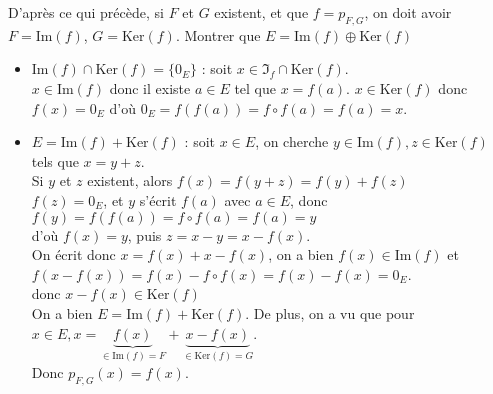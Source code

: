 \documentclass[12pt, a4paper]{report}
\begin{document}
\begin{demo}{}
D'après ce qui précède, si $F$ et $G$ existent, et que $f = p_{F,G}$, on doit avoir $F = \text{Im}(f)$, $G = \text{Ker}(f)$. 
Montrer que $E = \text{Im}(f) \oplus \text{Ker}(f)$ \\
\begin{itemize}
	\item $\text{Im}(f) \cap \text{Ker}(f) = \{0_E\}$ : soit $x \in \Im_f \cap \text{Ker}(f)$. \\
		$x \in \text{Im}(f)$ donc il existe $a \in E$ tel que $x = f(a)$.
		$x \in \text{Ker}(f)$ donc $f(x) = 0_E$ d'où $0_E = f(f(a)) = f \circ f(a) = f(a) = x$.
	
	\item $E = \text{Im}(f) + \text{Ker}(f)$ : soit $x \in E$, on cherche $y \in \text{Im}(f), z \in \text{Ker}(f)$ tels que $x = y+z$. \\
	Si $y$ et $z$ existent, alors $f(x) = f(y+z) = f(y)+f(z)$ \\
	$f(z) = 0_E$, et $y$ s'écrit $f(a)$ avec $a \in E$, donc $f(y) = f(f(a)) = f \circ f(a) = f(a) = y$ \\
	d'où $f(x) = y$, puis $z = x-y = x-f(x)$. \\
	
	On écrit donc $x = f(x) + x-f(x)$, on a bien $f(x) \in \text{Im}(f)$ et $f(x-f(x)) = f(x) - f \circ f(x) = f(x) - f(x) = 0_E$. \\
	donc $x-f(x) \in \text{Ker}(f)$\\
	
	On a bien $E = \text{Im}(f) + \text{Ker}(f)$. De plus, on a vu que pour $x \in E, x = \underbrace{f(x)}_{\in \text{Im}(f) = F} + \underbrace{x-f(x)}_{\in \text{Ker}(f) = G}$. \\
	Donc $p_{F,G}(x) = f(x)$.
\end{itemize}
\end{demo}
\end{document}
